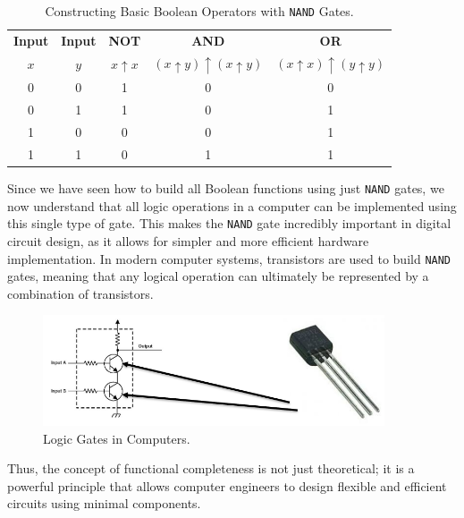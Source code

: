 \begin{table}[h!]
    \begin{center}
    \renewcommand{\arraystretch}{1.5} %
    \begin{tabular}{|c|c|c|c|c|}
    \textbf{Input} & \textbf{Input} & \textbf{NOT} & \textbf{AND} & \textbf{OR} \\
    $x$ & $y$ & $x \uparrow x$ & $(x \uparrow y) \uparrow (x \uparrow y)$ & $(x \uparrow x) \uparrow (y \uparrow y)$ \\
    \hline
    0 & 0 & 1 & 0 & 0 \\
    0 & 1 & 1 & 0 & 1 \\
    1 & 0 & 0 & 0 & 1 \\
    1 & 1 & 0 & 1 & 1 \\
    \end{tabular}
    \end{center}
    \caption{Constructing Basic Boolean Operators with \texttt{NAND} Gates.}
\end{table}

Since we have seen how to build all Boolean functions using just \texttt{NAND} gates, we now understand that all logic operations in a computer can be implemented using this single type of gate. This makes the \texttt{NAND} gate incredibly important in digital circuit design, as it allows for simpler and more efficient hardware implementation. In modern computer systems, transistors are used to build \texttt{NAND} gates, meaning that any logical operation can ultimately be represented by a combination of transistors.

\begin{figure}[h!]
    \centering
    \includegraphics[width = 0.9\textwidth]{figure/logicincomp.png} %
    \caption{Logic Gates in Computers.}
    \label{fig:logincom}
\end{figure}

Thus, the concept of functional completeness is not just theoretical; it is a powerful principle that allows computer engineers to design flexible and efficient circuits using minimal components.
